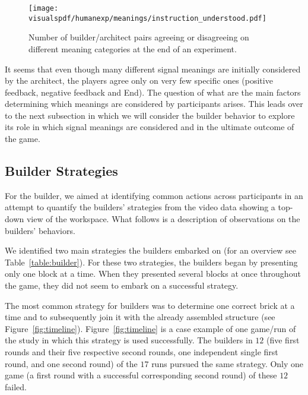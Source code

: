 \begin{figure}[!htbp]
  \begin{center}
      \texttt{[image: \\visualspdf/humanexp/meanings/instruction\_understood.pdf]}
      \caption{Number of builder/architect pairs agreeing or disagreeing on different meaning categories at the end of an experiment.}
    \label{fig:understanding_per_feedback}
    \end{center}
\end{figure}

It seems that even though many different signal meanings are initially considered by the architect, the players agree only on very few specific ones (positive feedback, negative feedback and End). The question of what are the main factors determining which meanings are considered by participants arises.
This leads over to the next subsection in which we will consider the builder behavior to explore its role in which signal meanings are considered and in the ultimate outcome of the game.

\subsection{Builder Strategies}
\label{sec:builder}
For the builder, we aimed at identifying common actions across participants in an attempt to quantify the builders' strategies from the video data showing a top-down view of the workspace.
What follows is a description of observations on the builders' behaviors.

We identified two main strategies the builders embarked on (for an overview see Table~\ref{table:builder}). For these two strategies, the builders began by presenting only one block at a time. When they presented several blocks at once throughout the game, they did not seem to embark on a successful strategy. 

The most common strategy for builders was to determine one correct brick at a time and to subsequently join it with the already assembled structure (see Figure~\ref{fig:timeline}). Figure~\ref{fig:timeline} is a case example of one game/run of the study in which this strategy is used successfully.
The builders in $12$ (five first rounds and their five respective second rounds, one independent single first round, and one second round) of the $17$ runs pursued the same strategy. Only one game (a first round with a successful corresponding second round) of these $12$ failed. 


